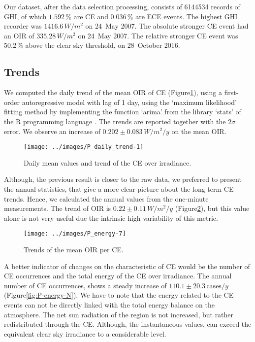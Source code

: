 \documentclass[preprint, 3p,
authoryear]{elsarticle} %
\begin{document}
Our dataset, after the data selection processing, consists of 6144534
records of GHI, of which \(1.592\,\%\) are CE and \(0.036\,\%\) are ECE
events. The highest GHI recorder was \(1416.6\,W/m^2\) on 24~May 2007.
The absolute stronger CE event had an OIR of \(335.28\,W/m^2\) on 24~May
2007. The relative stronger CE event was \(50.2\,\%\) above the clear
sky threshold, on 28~October 2016.

\hypertarget{trends}{%
\subsection{Trends}\label{trends}}

We computed the daily trend of the mean OIR of CE
(Figure\nobreakspace{}\ref{fig:CEmeanDaily}), using a first-order
autoregressive model with lag of 1 day, using the `maximum likelihood'
fitting method \citep{Gardner1980, Jones1980} by implementing the
function `arima' from the library `stats' of the R programming language
\citep{RCT2023}. The trends are reported together with the \(2\sigma\)
error. We observe an increase of \(0.202\pm 0.083\,W/m^2/y\) on the mean
OIR.

\begin{figure}

{\centering \texttt{[image: ../images/P\_daily\_trend-1]} 

}

\caption{Daily mean values and trend of the CE over irradiance.}\label{fig:CEmeanDaily}
\end{figure}

Although, the previous result is closer to the raw data, we preferred to
present the annual statistics, that give a more clear picture about the
long term CE trends. Hence, we calculated the annual values from the
one-minute measurements. The trend of OIR is \(0.22\pm 0.11\,W/m^2/y\)
(Figure\nobreakspace{}\ref{fig:P-energy-mean}), but this value alone is
not very useful due the intrinsic high variability of this metric.

\begin{figure}

{\centering \texttt{[image: ../images/P\_energy-7]} 

}

\caption{Trends of the mean OIR per CE.}\label{fig:P-energy-mean}
\end{figure}

A better indicator of changes on the characteristic of CE would be the
number of CE occurrences and the total energy of the CE over irradiance.
The annual number of CE occurrences, shows a steady increase of
\(110.1\pm 20.3\,\text{cases}/y\)
(Figure\nobreakspace{}\ref{fig:P-energy-N}). We have to note that the
energy related to the CE events can not be directly linked with the
total energy balance on the atmosphere. The net sun radiation of the
region is not increased, but rather redistributed through the CE.
Although, the instantaneous values, can exceed the equivalent clear sky
irradiance to a considerable level.
\end{document}
